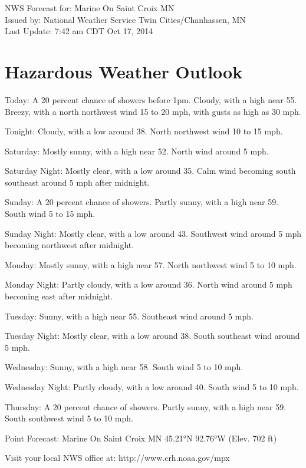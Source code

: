 \documentclass{article}
\begin{document}
\Large
NWS Forecast for: Marine On Saint Croix MN\\
Issued by: National Weather Service Twin Cities/Chanhassen, MN\\
Last Update: 7:42 am CDT Oct 17, 2014

\section*{Hazardous Weather Outlook}

Today: A 20 percent chance of showers before 1pm. Cloudy, with a high near 55. Breezy, with a north northwest wind 15 to 20 mph, with gusts as high as 30 mph.

Tonight: Cloudy, with a low around 38. North northwest wind 10 to 15 mph.

Saturday: Mostly sunny, with a high near 52. North wind around 5 mph.

Saturday Night: Mostly clear, with a low around 35. Calm wind becoming south southeast around 5 mph after midnight.

Sunday: A 20 percent chance of showers. Partly sunny, with a high near 59. South wind 5 to 15 mph.

Sunday Night: Mostly clear, with a low around 43. Southwest wind around 5 mph becoming northwest after midnight.

Monday: Mostly sunny, with a high near 57. North northwest wind 5 to 10 mph.

Monday Night: Partly cloudy, with a low around 36. North wind around 5 mph becoming east after midnight.

Tuesday: Sunny, with a high near 55. Southeast wind around 5 mph.

Tuesday Night: Mostly clear, with a low around 38. South southeast wind around 5 mph.

Wednesday: Sunny, with a high near 58. South wind 5 to 10 mph.

Wednesday Night: Partly cloudy, with a low around 40. South wind 5 to 10 mph.

Thursday: A 20 percent chance of showers. Partly sunny, with a high near 59. South southwest wind 5 to 10 mph.


Point Forecast: Marine On Saint Croix MN
 45.21°N 92.76°W (Elev. 702 ft)

Visit your local NWS office at: http://www.crh.noaa.gov/mpx
\end{document}
